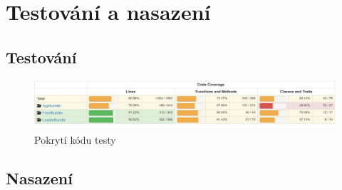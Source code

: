 \chapter{Testování a nasazení}

\section{Testování}

\begin{figure}[htbp]
    \centering
    \includegraphics[width=\textwidth,height=\textheight,keepaspectratio]{images/coverage.png}
    \caption{Pokrytí kódu testy\label{test-coverage}}
\end{figure}




\section{Nasazení}
